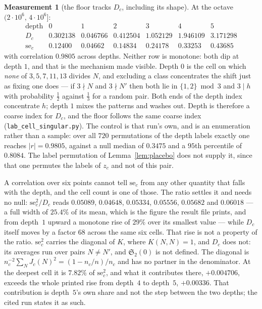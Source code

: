 \documentclass[11pt,a4paper]{article}
\theoremstyle{plain}
\theoremstyle{definition}
\newtheorem{measurement}[theorem]{Measurement}
\theoremstyle{remark}
\renewcommand{\SS}{\mathfrak{S}}
\begin{document}
\begin{measurement}[the floor tracks $D_c$, including its shape]%
\label{meas:Dc}
At the octave $(2\cdot10^6,\,4\cdot10^6]$:
\[
\begin{array}{r|cccccc}
 \text{depth} & 0 & 1 & 2 & 3 & 4 & 5\\\hline
 D_c & 0.302138 & 0.046766 & 0.412504 & 1.052129 & 1.946109
   & 3.171298\\
 \mathrm{se}_c & 0.12400 & 0.04662 & 0.14834 & 0.24178 & 0.33253
   & 0.43685
\end{array}
\]
with correlation $0.9805$ across depths. Neither row is monotone: both
dip at depth $1$, and that is the mechanism made visible. Depth $0$ is
the cell on which \emph{none} of $3,5,7,11,13$ divides $N$, and
excluding a class concentrates the shift just as fixing one does ---
if $3\nmid N$ and $3\nmid N'$ then both lie in $\{1,2\}\bmod3$ and
$3\mid h$ with probability $\tfrac12$ against $\tfrac13$ for a random
pair. Both ends of the depth index concentrate $h$; depth $1$ mixes
the patterns and washes out. Depth is therefore a coarse index for
$D_c$, and the floor follows the same coarse index
(\texttt{lab\_cell\_singular.py}). The control is that run's own, and
is an enumeration rather than a sample: over all $720$ permutations of
the depth labels exactly one reaches $|r|=0.9805$, against a null
median of $0.3475$ and a $95$th percentile of $0.8084$. The
label permutation of Lemma~\ref{lem:placebo} does not supply it, since
that one permutes the labels of $z_c$ and not of this pair.

A correlation over six points cannot tell $\mathrm{se}_c$ from any
other quantity that falls with the depth, and the cell count is one of
those. The ratio settles it and needs no null: $\mathrm{se}_c^2/D_c$
reads $0.05089$, $0.04648$, $0.05334$, $0.05556$, $0.05682$ and
$0.06018$ --- a full width of $25.4\%$ of its mean, which is the
figure the result file prints, and from depth~$1$ upward a monotone
rise of $29\%$ over its smallest value --- while $D_c$ itself moves by
a factor $68$ across the same six cells. That rise is not a property
of the ratio. $\mathrm{se}_c^2$ carries the diagonal of $K$, where
$K(N,N)=1$, and $D_c$ does not: its averages run over pairs $N\ne N'$,
and $\SS_2(0)$ is not defined. The diagonal is
$n_c^{-2}\sum_NJ_c(N)^2=(1-n_c/n)/n_c$ and has no partner in the
denominator. At the deepest cell it is $7.82\%$ of $\mathrm{se}_c^2$,
and what it contributes there, $+0.004706$, exceeds the whole printed
rise from depth~$4$ to depth~$5$, $+0.00336$. That contribution is
depth~$5$'s own share and not the step between the two depths; the
cited run states it as such.


\end{measurement}
\end{document}
